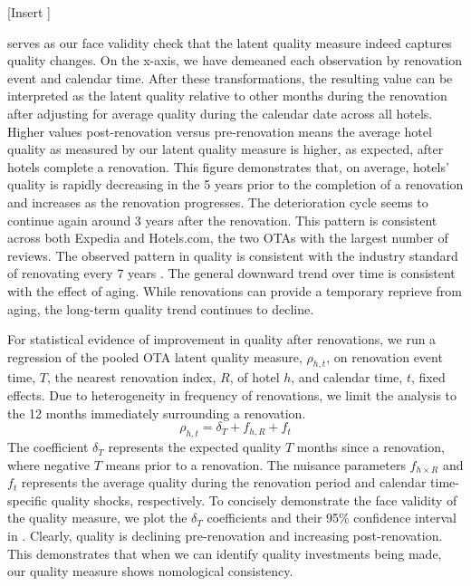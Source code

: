 \documentclass[mksc,blindrev]{informs3} %
\begin{document}
[Insert ]

 serves as our face validity check that the latent quality measure indeed captures quality changes. On the x-axis, we have demeaned each observation by renovation event and calendar time. After these transformations, the resulting value can be interpreted as the latent quality relative to other months during the renovation after adjusting for average quality during the calendar date across all hotels. Higher values post-renovation versus pre-renovation means the average hotel quality as measured by our latent quality measure is higher, as expected, after hotels complete a renovation. This figure demonstrates that, on average, hotels' quality is rapidly decreasing in the 5 years prior to the completion of a renovation and increases as the renovation progresses. The deterioration cycle seems to continue again around 3 years after the renovation. This pattern is consistent across both Expedia and Hotels.com, the two OTAs with the largest number of reviews. The observed pattern in quality is consistent with the industry standard of renovating every 7 years \citep{renofreq2008}. The general downward trend over time is consistent with the effect of aging. While renovations can provide a temporary reprieve from aging, the long-term quality trend continues to decline. 

For statistical evidence of improvement in quality after renovations, we run a regression of the pooled OTA latent quality measure, $\rho_{h,t}$, on renovation event time, $T$, the nearest renovation index, $R$, of hotel $h$, and calendar time, $t$, fixed effects. Due to heterogeneity in frequency of renovations, we limit the analysis to the 12 months immediately surrounding a renovation.
\begin{equation}\label{eq:renoreg}
\rho_{h,t}=\delta_{T}+f_{h,R}+f_{t}
\end{equation}
The coefficient $\delta_T$ represents the expected quality $T$ months since a renovation, where negative $T$ means prior to a renovation. The nuisance parameters $f_{h\times R}$ and $f_t$ represents the average quality during the renovation period and calendar time-specific quality shocks, respectively. To concisely demonstrate the face validity of the quality measure, we plot the $\delta_T$ coefficients and their 95\% confidence interval in . Clearly, quality is declining pre-renovation and increasing post-renovation. This demonstrates that when we can identify quality investments being made, our quality measure shows nomological consistency. 
\end{document}
